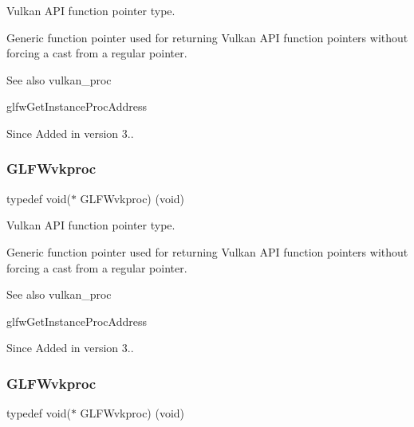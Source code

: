 Vulkan A\+PI function pointer type. 

Generic function pointer used for returning Vulkan A\+PI function pointers without forcing a cast from a regular pointer.

\begin{DoxySeeAlso}{See also}
vulkan\+\_\+proc 

glfw\+Get\+Instance\+Proc\+Address
\end{DoxySeeAlso}
\begin{DoxySince}{Since}
Added in version 3.. 
\end{DoxySince}
\mbox{\label{group__vulkan_ga70c01918dc9d233a4fbe0681a43018af}} 
\subsubsection{\texorpdfstring{G\+L\+F\+Wvkproc}{GLFWvkproc}\hspace{0.1cm}{\footnotesize\ttfamily [4/5]}}
{\footnotesize\ttfamily typedef void($\ast$ G\+L\+F\+Wvkproc) (void)}



Vulkan A\+PI function pointer type. 

Generic function pointer used for returning Vulkan A\+PI function pointers without forcing a cast from a regular pointer.

\begin{DoxySeeAlso}{See also}
vulkan\+\_\+proc 

glfw\+Get\+Instance\+Proc\+Address
\end{DoxySeeAlso}
\begin{DoxySince}{Since}
Added in version 3.. 
\end{DoxySince}
\mbox{\label{group__vulkan_ga70c01918dc9d233a4fbe0681a43018af}} 
\subsubsection{\texorpdfstring{G\+L\+F\+Wvkproc}{GLFWvkproc}\hspace{0.1cm}{\footnotesize\ttfamily [5/5]}}
{\footnotesize\ttfamily typedef void($\ast$ G\+L\+F\+Wvkproc) (void)}



